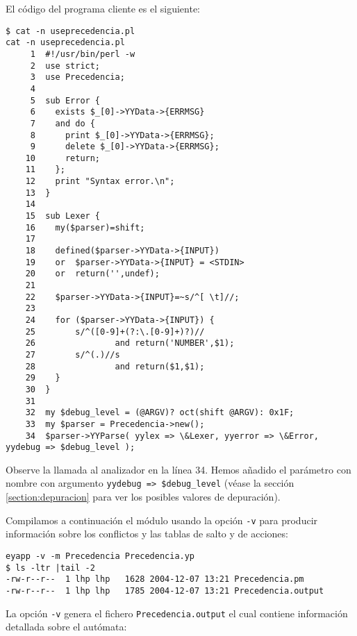 El código del programa cliente es el siguiente:

\begin{verbatim}
$ cat -n useprecedencia.pl
cat -n useprecedencia.pl
     1  #!/usr/bin/perl -w
     2  use strict;
     3  use Precedencia;
     4
     5  sub Error {
     6    exists $_[0]->YYData->{ERRMSG}
     7    and do {
     8      print $_[0]->YYData->{ERRMSG};
     9      delete $_[0]->YYData->{ERRMSG};
    10      return;
    11    };
    12    print "Syntax error.\n";
    13  }
    14
    15  sub Lexer {
    16    my($parser)=shift;
    17
    18    defined($parser->YYData->{INPUT})
    19    or  $parser->YYData->{INPUT} = <STDIN>
    20    or  return('',undef);
    21
    22    $parser->YYData->{INPUT}=~s/^[ \t]//;
    23
    24    for ($parser->YYData->{INPUT}) {
    25        s/^([0-9]+(?:\.[0-9]+)?)//
    26                and return('NUMBER',$1);
    27        s/^(.)//s
    28                and return($1,$1);
    29    }
    30  }
    31
    32  my $debug_level = (@ARGV)? oct(shift @ARGV): 0x1F;
    33  my $parser = Precedencia->new();
    34  $parser->YYParse( yylex => \&Lexer, yyerror => \&Error, yydebug => $debug_level );
\end{verbatim}

Observe la llamada al analizador en la línea 34. Hemos 
añadido el parámetro con nombre  
con argumento \verb|yydebug => $debug_level| (véase la
sección \ref{section:depuracion} para ver los posibles
valores de depuración).

Compilamos a continuación el módulo usando la opción \verb|-v| para
producir información sobre los conflictos y las tablas de salto y 
de acciones:
\begin{verbatim}
eyapp -v -m Precedencia Precedencia.yp
$ ls -ltr |tail -2
-rw-r--r--  1 lhp lhp   1628 2004-12-07 13:21 Precedencia.pm
-rw-r--r--  1 lhp lhp   1785 2004-12-07 13:21 Precedencia.output
\end{verbatim}

La opción \verb|-v| genera el fichero \verb|Precedencia.output|
el cual contiene información detallada sobre el autómata:

